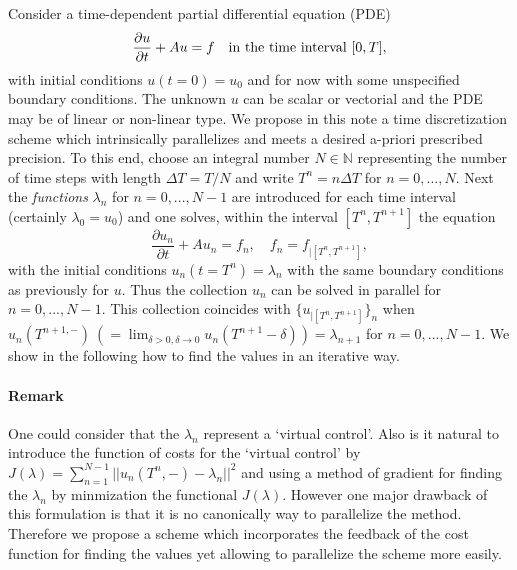 Consider a time-dependent partial differential equation (PDE)
\begin{equation}
\frac{\partial{u}}{\partial{t}} + Au = f\quad \textnormal{in the time interval}\ [0, T],
\end{equation}
with initial conditions $u(t=0) = u_0$ and for now with some unspecified boundary conditions.
The unknown $u$ can be scalar or vectorial and the PDE may be of linear or non-linear type.
We propose in this note a time discretization scheme which intrinsically parallelizes and
meets a desired a-priori prescribed precision. To this end, choose an integral number 
$N \in \mathbb{N}$ representing the number of time steps with length $\Delta T = T / N$ 
and write $T^n = n \Delta T$ for $n=0, ... ,N$. Next the \textit{functions} $\lambda_n$ for
$n=0, ..., N-1$ are introduced for each time interval (certainly $\lambda_0 = u_0$) and one
solves, within the interval $[T^n, T^{n+1}]$ the equation
\begin{equation}
\frac{\partial u_n}{\partial t} + A u_n = f_n, \quad f_n = f_{|[T^n, T^{n+1}]},
\end{equation}
with the initial conditions $u_n(t=T^n)=\lambda_n$ with the same boundary conditions as
previously for $u$. Thus the collection $u_n$ can be solved in parallel for $n=0, ..., N-1$.
This collection coincides with 
$\{u_{|[T^n, T^{n+1}]}\}_n$ when $u_n(T^{n+1,-})\ (=\lim_{\delta>0, \delta \to 0} u_n(T^{n+1} - \delta)) = \lambda_{n+1}$
for $n=0, ..., N-1$. We show in the following how to find the values in an iterative way.

\paragraph{Remark} One could consider that the $\lambda_n$ represent a `virtual control'. 
Also is it natural to introduce the function of costs for the `virtual control' by 
$J(\lambda) = \sum_{n=1}^{N-1} ||u_n(T^n,-) - \lambda_n||^2$ and using a method of gradient
for finding the $\lambda_n$ by minmization the functional $J(\lambda)$. However one major
drawback of this formulation is that it is no canonically way to parallelize the method.
Therefore we propose a scheme which incorporates the feedback of the cost function for
finding the values yet allowing to parallelize the scheme more easily.

